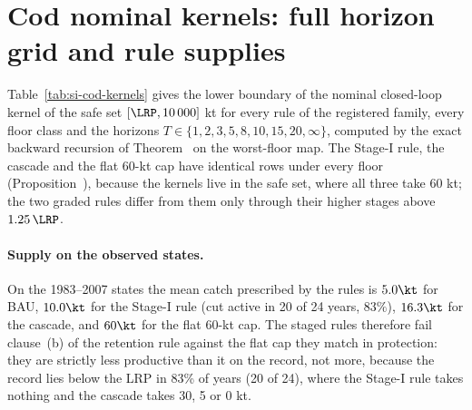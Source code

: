 \section{Cod nominal kernels: full horizon grid and rule supplies}\label{si:cod-kernels}
Table~\ref{tab:si-cod-kernels} gives the lower boundary of the nominal closed-loop kernel of the safe set $[\LRP,10\,000]$ kt for every rule of the registered family, every floor class and the horizons $T\in\{1,2,3,5,8,10,15,20,\infty\}$, computed by the exact backward recursion of Theorem~ on the worst-floor map. The Stage-I rule, the cascade and the flat 60-kt cap have identical rows under every floor (Proposition~), because the kernels live in the safe set, where all three take 60 kt; the two graded rules differ from them only through their higher stages above $1.25\,\LRP$.

\paragraph{Supply on the observed states.} On the 1983--2007 states the mean catch prescribed by the rules is $5.0\kt$ for BAU, $10.0\kt$ for the Stage-I rule (cut active in 20 of 24 years, $83\%$), $16.3\kt$ for the cascade, and $60\kt$ for the flat 60-kt cap. The staged rules therefore fail clause~(b) of the retention rule against the flat cap they match in protection: they are strictly less productive than it on the record, not more, because the record lies below the LRP in 83\% of years (20 of 24), where the Stage-I rule takes nothing and the cascade takes 30, 5 or 0 kt.

